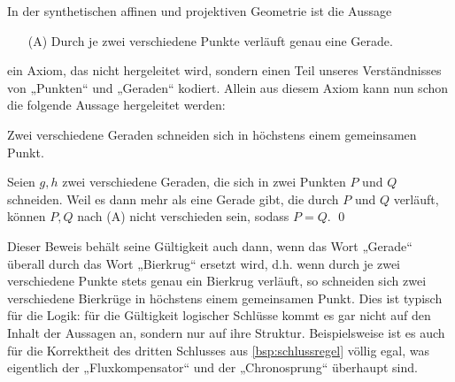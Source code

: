 \begin{bsp}[*]
    In der synthetischen affinen und projektiven Geometrie ist die Aussage
    \begin{itemize}
        \item[(A)] Durch je zwei verschiedene Punkte verläuft genau eine Gerade.
    \end{itemize}
    ein Axiom, das nicht hergeleitet wird, sondern einen Teil unseres Verständnisses von „Punkten“ und „Geraden“ kodiert. Allein aus diesem Axiom kann nun schon die folgende Aussage hergeleitet werden:
    \begin{satz}[*]
        Zwei verschiedene Geraden schneiden sich in höchstens einem gemeinsamen Punkt.
    \end{satz}
    \begin{bew}
        Seien $g,h$ zwei verschiedene Geraden, die sich in zwei Punkten $P$ und $Q$ schneiden. Weil es dann mehr als eine Gerade gibt, die durch $P$ und $Q$ verläuft, können $P,Q$ nach (A) nicht verschieden sein, sodass $P=Q$. \qed
    \end{bew}
\end{bsp}


\begin{bem}
    Dieser Beweis behält seine Gültigkeit auch dann, wenn das Wort „Gerade“ überall durch das Wort „Bierkrug“ ersetzt wird, d.h. wenn durch je zwei verschiedene Punkte stets genau ein Bierkrug verläuft, so schneiden sich zwei verschiedene Bierkrüge in höchstens einem gemeinsamen Punkt. Dies ist typisch für die Logik: für die Gültigkeit logischer Schlüsse kommt es gar nicht auf den Inhalt der Aussagen an, sondern nur auf ihre Struktur. Beispielsweise ist es auch für die Korrektheit des dritten Schlusses aus \cref{bsp:schlussregel} völlig egal, was eigentlich der „Fluxkompensator“ und der „Chronosprung“ überhaupt sind.
\end{bem}


